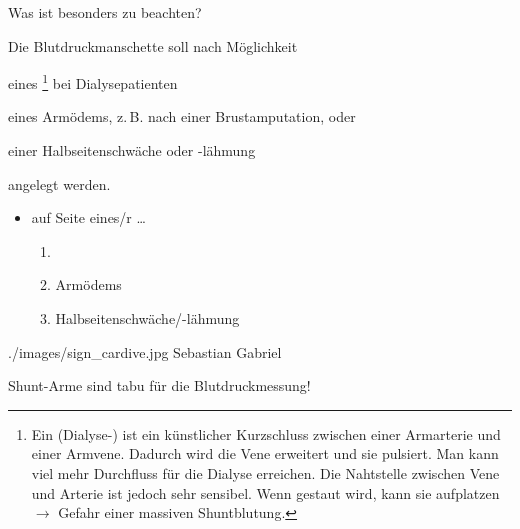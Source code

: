 \TextSlideTeaser
{Was ist besonders zu beachten?}%
{%
Die Blutdruckmanschette soll nach Möglichkeit 
\begin{inparaenum}
  \item eines \footnote{Ein
  (Dialyse-) ist ein künstlicher Kurzschluss
  zwischen einer Armarterie und einer Armvene. Dadurch wird
  die Vene erweitert und sie pulsiert. Man kann viel mehr
  Durchfluss für die Dialyse erreichen. Die Nahtstelle
  zwischen Vene und Arterie ist jedoch sehr sensibel. Wenn
  gestaut wird, kann sie aufplatzen $\rightarrow$ Gefahr
  einer massiven Shuntblutung.} bei Dialysepatienten \item
  eines Armödems, z.\,B. nach einer Brustamputation, oder
  \item einer Halbseitenschwäche oder -lähmung
\end{inparaenum}
angelegt werden.}%
{
\begin{itemize}
  \item {} auf Seite eines/r \dots{}
  \begin{enumerate}
    \item {}
    \item Armödems
    \item Halbseitenschwäche/-lähmung
  \end{enumerate}
\end{itemize}}%
{./images/sign_cardive.jpg}%
{}%
{}%
{Sebastian Gabriel}%
{}%

\begin{Danger}
  \item Shunt-Arme sind tabu für die Blutdruckmessung!
\end{Danger}





